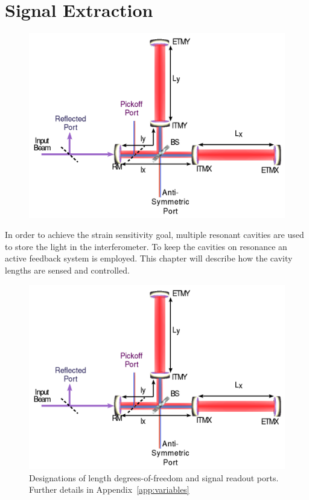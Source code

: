 \chapter{Signal Extraction}
\label{chap:signals}

\begin{figure}[!h]
\centerline{\includegraphics[angle=0,width=6.5in]{Figures/Chap3/IFO2.png}}
\end{figure}
\clearpage

In order to achieve the strain sensitivity goal, multiple resonant cavities
are used to store the light in the interferometer. To keep the cavities
on resonance an active feedback system is employed. This chapter will 
describe how the cavity lengths are sensed and controlled.

\begin{figure}[!h]
\centerline{\includegraphics[angle=0,width=6.5in]{Figures/Chap3/IFO2.png}}
\caption[Length Definitions]{Designations of length degrees-of-freedom and signal
                  readout ports. Further details in Appendix~\ref{app:variables}}
\label{fig:DOFs}
\end{figure}



